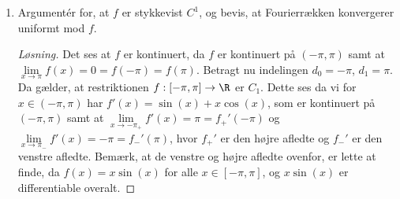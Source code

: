 \begin{opg}
\begin{enumerate}
\begin{proof}[Løsning]
			$$
			\sum_{n\in \mathbb{Z}}c_n(f)e^{inx}=1-\frac{1}{4}(e^{ix}+e^{-ix})-\sum_{n=2}^{\infty}\frac{(-1)^n}{n^2-1}\left(e^{inx}+e^{-inx}\right).
			$$
		\end{proof}
		\fi
		\item Argumentér for, at $ f $ er stykkevist $ C^1 $, og bevis, at Fourierrækken konvergerer uniformt mod $ f $.
		\ifanswers
		\begin{proof}[Løsning]
			Det ses at $ f $ er kontinuert, da $ f $ er kontinuert på $ (-\pi,\pi) $ samt at $ \lim\limits_{x\to\pi}f(x)=0=f(-\pi)=f(\pi) $.
			Betragt nu indelingen $ d_0=-\pi $, $ d_1=\pi $. Da gælder, at restriktionen $ f:[-\pi,\pi]\to\R $ er $ C_1 $. Dette ses da vi for $ x\in (-\pi,\pi) $ har $ f'(x)=\sin(x)+x\cos(x) $, som er kontinuert på $ (-\pi,\pi) $ samt at $ \lim\limits_{x\to-\pi_+}f'(x)=\pi=f_+'(-\pi) $ og $ \lim\limits_{x\to\pi_-}f'(x)=-\pi=f_-'(\pi) $, hvor $ f_+' $ er den højre afledte og $ f_-' $ er den venstre afledte. Bemærk, at de venstre og højre afledte ovenfor, er lette at finde, da $ f(x)=x\sin(x) $ for alle $ x\in[-\pi,\pi] $, og $ x\sin(x) $ er differentiable overalt.
			

\end{proof}
\end{enumerate}
\end{opg}

